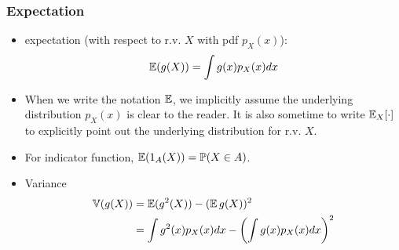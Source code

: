 \documentclass[english,10pt,handout]{beamer}
\begin{document}
\begin{frame}
\frametitle{Expectation}
\begin{itemize}
\item expectation (with respect to r.v. $X$ with pdf $p_X(x)$):
\[\operatorname{\mathbb E}(g(X)) = \int g(x) p_X(x)dx\]
\item When we write the notation $\operatorname{\mathbb E}$, we implicitly assume the underlying distribution $p_X(x)$
is clear to the reader.  It is also sometime to write $\operatorname{\mathbb E}_X[\cdot]$ to explicitly point out 
the underlying distribution for r.v. $X$.

\item For indicator function, 
$\operatorname{\mathbb E}(1_A(X))=\mathbb{P}(X\in A)$.
\item Variance 
\pause
\begin{align*}
\operatorname{\mathbb{V} }(g(X))&= \operatorname{\mathbb E}(g^2(X)) - (\operatorname{\mathbb E} g(X))^2\\
 &=\int g^2(x)p_X(x)dx - \left(\int g(x)p_X(x)dx\right)^2
\end{align*}
\end{itemize}
\end{frame}
%
%
%
%
\end{document}
